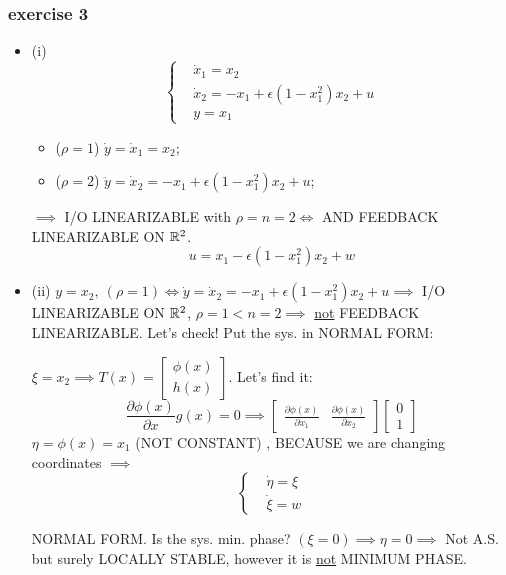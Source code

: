 \subsubsection{exercise 3}

\begin{itemize}
\item{(i)}
\[
	\left\{
	\begin{aligned}
	&\dot{x}_1 = x_2 \\
	&\dot{x}_2 = -x_1 + \epsilon(1-x_1^2)x_2 + u \\
	&y = x_1
	\end{aligned}
	\right.
\]

\begin{itemize}
\item{($\rho=1$)} $\dot{y}=\dot{x}_1=x_2$;
\item{($\rho=2$)} $\ddot{y}=\dot{x}_2 = -x_1 + \epsilon(1-x_1^2)x_2 + u$;
\end{itemize}

$\implies$ I/O LINEARIZABLE with $\rho=n=2 \iff$ AND FEEDBACK LINEARIZABLE ON $\mathbb{R}^2$.
\[
	u = x_1 - \epsilon(1-x_1^2)x_2 + w
\]
\item{(ii)}
$y=x_2,\ (\rho=1) \iff \dot{y}=\dot{x}_2=-x_1+\epsilon(1-x_1^2)x_2+u \implies$ I/O LINEARIZABLE ON $\mathbb{R}^2$, $\rho=1<n=2 \implies$ \underline{not} FEEDBACK LINEARIZABLE. Let's check!
Put the sys. in NORMAL FORM:

$\xi = x_2 \implies T(x) = \begin{bmatrix}\phi(x)\\h(x)\end{bmatrix}$. Let's find it:
\[
	\frac{\partial{\phi(x)}}{\partial{x}}g(x) = 0 \implies \begin{bmatrix}\frac{\partial{\phi(x)}}{\partial{x_1}}&\frac{\partial{\phi(x)}}{\partial{x_2}}\end{bmatrix}\begin{bmatrix}0\\1\end{bmatrix}
\]
$\eta = \phi(x) = x_1$ (NOT CONSTANT) , BECAUSE we are changing coordinates $\implies$
\[
	\left\{
	\begin{aligned}
	&\dot{\eta} = \xi \\
	&\dot{\xi} = w
	\end{aligned}
	\right.
\]

NORMAL FORM. Is the sys. min. phase?
$(\xi = 0) \implies \eta = 0 \implies$ Not A.S. but surely LOCALLY STABLE, however it is \underline{not} MINIMUM PHASE.
\end{itemize}

